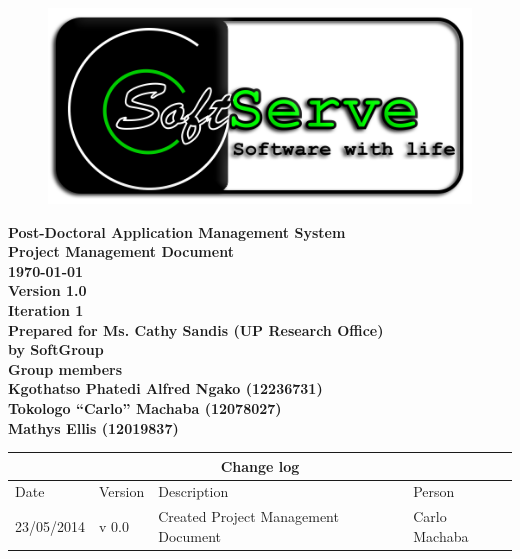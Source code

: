 \documentclass[12pt]{article}
\newcommand{\Title}{Project Management Document} %
\newcommand{\ssr}{Soft\color{green}{Serve }\color{black}}
\newcommand{\version}{1.0}
\newcommand{\iteration}{1}
\newcommand{\client}{Ms. Cathy Sandis (UP Research Office)}
\newcommand{\project}{Post-Doctoral Application Management System}
\begin{document}
\vspace{4em}

\begin{center}%

\begin{figure}[ht!]
\centering
\includegraphics{../Images_Docs/logo.png}
\end{figure}
\LARGE \bf \project \\[1em]
\LARGE \bf \Title \\[0.25em]
\large \bf \today\\
\bf Version \version\\
\bf Iteration \iteration\\[0.5em]
\Large \bf Prepared for \client\\
\Large \bf by
\Large {\bf \ssr Group }\\[0.5em]
\LARGE {\bf Group members}\\[0.25em]
\large
Kgothatso Phatedi Alfred Ngako (12236731) \\[0.5em]
Tokologo “Carlo” Machaba (12078027) \\[0.5em]
Mathys Ellis (12019837) \\[8em]

\end{center}%


\begin{center}
\begin{tabular}{|l|p{1.4cm}|p{8cm}|p{2.8cm}|}
\hline
\multicolumn{4}{|c|}{\bf Change log} \\
\hline
 Date & Version & Description &  Person \\
\hline
23/05/2014 & v 0.0 & Created Project Management Document & Carlo Machaba \\
\hline

\end{tabular}
\end{center}
\newpage
\tableofcontents
\end{document}
